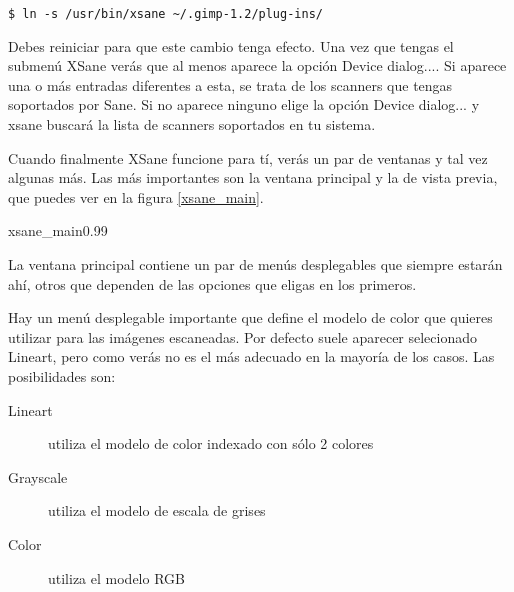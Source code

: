 \begin{verbatim}
$ ln -s /usr/bin/xsane ~/.gimp-1.2/plug-ins/
\end{verbatim}

Debes reiniciar \gimp  para que este cambio tenga efecto.  Una vez que
tengas el  submenú {\sf XSane}  verás que  al menos aparece  la opción
{\sf Device  dialog...}. Si  aparece una o  más entradas  diferentes a
esta, se trata  de los scanners que tengas soportados  por Sane. Si no
aparece ninguno elige  la opción {\sf Device dialog...}  y {\sf xsane}
buscará la lista de scanners soportados en tu sistema.

Cuando finalmente XSane  funcione para tí, verás un par  de ventanas y
tal vez algunas más. Las más importantes son la ventana principal y la
de vista previa, que puedes ver en la figura \ref{xsane_main}.

\begin{figura}{xsane_main}{0.99}
\caption{Ventanas principales de {\sf XSane}}
\label{xsane_main}
\end{figura}

La ventana principal contiene un par de menús desplegables que siempre
estarán ahí,  otros que  dependen de  las opciones  que eligas  en los
primeros.

% 
% 
% 
% 
% 
% 
% 

Hay un menú  desplegable importante que define el modelo  de color que
quieres  utilizar  para las  imágenes  escaneadas.  Por defecto  suele
aparecer  selecionado {\sf  Lineart}, pero  como  verás no  es el  más
adecuado en la mayoría de los casos. Las posibilidades son:

\begin{description}

\item[Lineart] utiliza el modelo de color indexado con sólo 2 colores

\item[Grayscale] utiliza el modelo de escala de grises

\item[Color] utiliza el modelo RGB

\end{description}

